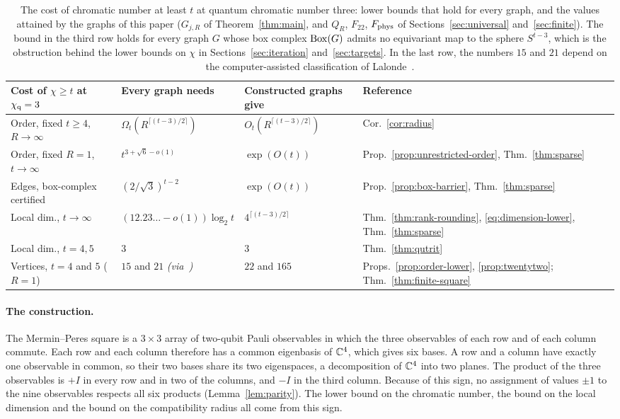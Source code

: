 \begin{table}[!htbp]
\centering
\footnotesize
\setlength{\tabcolsep}{2.5pt}
\begin{tabular}{@{}llll@{}}
\toprule
Cost of $\chi\ge t$ at $\chi_{\mathrm q}=3$ & Every graph needs & Constructed graphs give & Reference \\
\midrule
Order, fixed $t\ge4$, $R\to\infty$ & $\Omega_t(R^{\lceil(t-3)/2\rceil})$ & $O_t(R^{\lceil(t-3)/2\rceil})$ & Cor.~\ref{cor:radius} \\
Order, fixed $R=1$, $t\to\infty$ & $t^{3+\sqrt6-o(1)}$ & $\exp(O(t))$ & Prop.~\ref{prop:unrestricted-order}, Thm.~\ref{thm:sparse} \\
Edges, box-complex certified & $(2/\sqrt3)^{t-2}$ & $\exp(O(t))$ & Prop.~\ref{prop:box-barrier}, Thm.~\ref{thm:sparse} \\
Local dim., $t\to\infty$ & $(12.23\ldots-o(1))\log_2 t$ & $4^{\lceil(t-3)/2\rceil}$ & Thm.~\ref{thm:rank-rounding}, \eqref{eq:dimension-lower}, Thm.~\ref{thm:sparse} \\
Local dim., $t=4,5$ & $3$ & $3$ & Thm.~\ref{thm:qutrit} \\
Vertices, $t=4$ and $5$ ($R=1$) & $15$ and $21$ \emph{(via~\cite{La})} & $22$ and $165$ & Props.~\ref{prop:order-lower}, \ref{prop:twentytwo}; Thm.~\ref{thm:finite-square} \\
\bottomrule
\end{tabular}
\caption{The cost of chromatic number at least $t$ at quantum chromatic number three: lower bounds that hold for every graph, and the values attained by the graphs of this paper ($G_{j,R}$ of Theorem~\ref{thm:main}, and $Q_R$, $F_{22}$, $F_{\rm phys}$ of Sections~\ref{sec:universal} and~\ref{sec:finite}). The bound in the third row holds for every graph $G$ whose box complex $\operatorname{Box}(G)$ admits no equivariant map to the sphere $S^{t-3}$, which is the obstruction behind the lower bounds on $\chi$ in Sections~\ref{sec:iteration} and~\ref{sec:targets}. In the last row, the numbers $15$ and $21$ depend on the computer-assisted classification of Lalonde~\cite{La}.}
\label{tab:costs}
\end{table}

\paragraph{The construction.}
The Mermin--Peres square is a $3\times3$ array of two-qubit Pauli observables in which the three observables of each row and of each column commute. Each row and each column therefore has a common eigenbasis of $\mathbb C^4$, which gives six bases. A row and a column have exactly one observable in common, so their two bases share its two eigenspaces, a decomposition of $\mathbb C^4$ into two planes. The product of the three observables is $+I$ in every row and in two of the columns, and $-I$ in the third column. Because of this sign, no assignment of values $\pm1$ to the nine observables respects all six products (Lemma~\ref{lem:parity}). The lower bound on the chromatic number, the bound on the local dimension and the bound on the compatibility radius all come from this sign.

